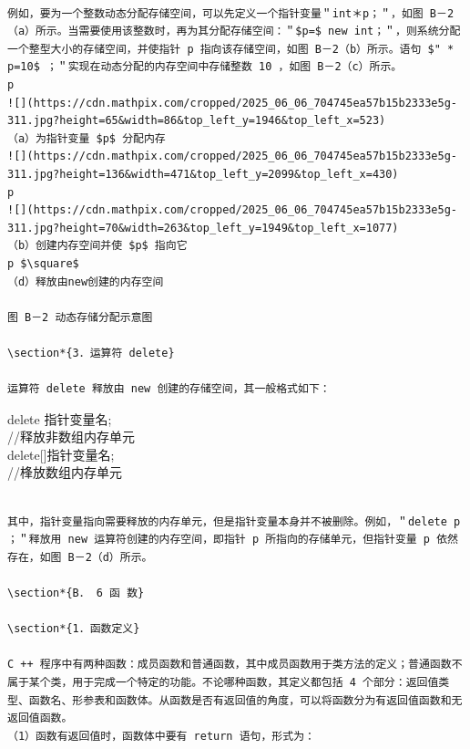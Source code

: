 \documentclass[10pt]{article}
\begin{document}
\begin{verbatim}

例如，要为一个整数动态分配存储空间，可以先定义一个指针变量＂int＊p；＂，如图 B－2（a）所示。当需要使用该整数时，再为其分配存储空间：＂$p=$ new int；＂，则系统分配一个整型大小的存储空间，并使指针 p 指向该存储空间，如图 B－2（b）所示。语句 $" * p=10$ ；＂实现在动态分配的内存空间中存储整数 10 ，如图 B－2（c）所示。
p
![](https://cdn.mathpix.com/cropped/2025_06_06_704745ea57b15b2333e5g-311.jpg?height=65&width=86&top_left_y=1946&top_left_x=523)
（a）为指针变量 $p$ 分配内存
![](https://cdn.mathpix.com/cropped/2025_06_06_704745ea57b15b2333e5g-311.jpg?height=136&width=471&top_left_y=2099&top_left_x=430)
p
![](https://cdn.mathpix.com/cropped/2025_06_06_704745ea57b15b2333e5g-311.jpg?height=70&width=263&top_left_y=1949&top_left_x=1077)
（b）创建内存空间并使 $p$ 指向它
p $\square$
（d）释放由new创建的内存空间

图 B－2 动态存储分配示意图

\section*{3．运算符 delete}

运算符 delete 释放由 new 创建的存储空间，其一般格式如下：
\end{verbatim}

delete 指针变量名;\\
//释放非数组内存单元\\[0pt]
delete[]指针变量名;\\
//桻放数组内存单元

\begin{verbatim}

其中，指针变量指向需要释放的内存单元，但是指针变量本身并不被删除。例如，＂delete p ；＂释放用 new 运算符创建的内存空间，即指针 p 所指向的存储单元，但指针变量 p 依然存在，如图 B－2（d）所示。

\section*{B． 6 函 数}

\section*{1．函数定义}

C ++ 程序中有两种函数：成员函数和普通函数，其中成员函数用于类方法的定义；普通函数不属于某个类，用于完成一个特定的功能。不论哪种函数，其定义都包括 4 个部分：返回值类型、函数名、形参表和函数体。从函数是否有返回值的角度，可以将函数分为有返回值函数和无返回值函数。
（1）函数有返回值时，函数体中要有 return 语句，形式为：
\end{verbatim}
\end{document}
